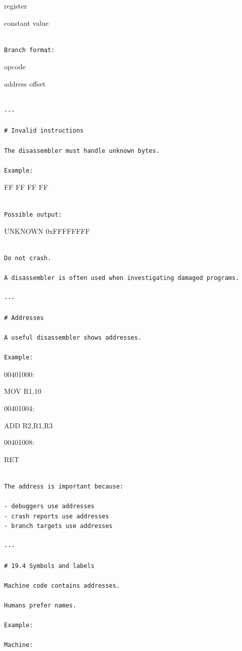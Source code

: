 \documentclass[
  oneside,
  openany]{book}
\begin{document}
register

constant value

\begin{verbatim}

Branch format:
\end{verbatim}

opcode

address offset

\begin{verbatim}

---

# Invalid instructions

The disassembler must handle unknown bytes.

Example:
\end{verbatim}

FF FF FF FF

\begin{verbatim}

Possible output:
\end{verbatim}

UNKNOWN 0xFFFFFFFF

\begin{verbatim}

Do not crash.

A disassembler is often used when investigating damaged programs.

---

# Addresses

A useful disassembler shows addresses.

Example:
\end{verbatim}

00401000:

MOV R1,10

00401004:

ADD R2,R1,R3

00401008:

RET

\begin{verbatim}

The address is important because:

- debuggers use addresses
- crash reports use addresses
- branch targets use addresses

---

# 19.4 Symbols and labels

Machine code contains addresses.

Humans prefer names.

Example:

Machine:
\end{verbatim}
\end{document}
